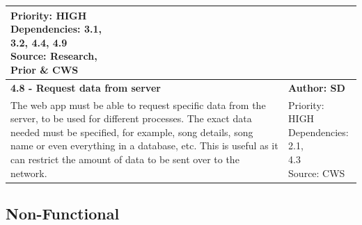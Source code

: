 \documentclass[10pt, notitlepage]{report}
\begin{document}
\begin{center}
\begin{longtable}{| p{13cm} | p{3cm} |}
\makecell{Priority: HIGH\\Dependencies: 3.1,\\3.2, 4.4, 4.9\\Source: Research,\\Prior \& CWS}\\
\hline
\textbf{4.8 -  Request data from server} & \textbf{Author: SD} \\
\hline
The web app must be able to request specific data from the server, to be used for different processes. The exact data needed must be specified, for example, song details, song name or even everything in a database, etc. This is useful as it can restrict the amount of data to be sent over to the network.&
\makecell{Priority: HIGH\\Dependencies: 2.1,\\4.3\\Source: CWS}\\
\hline

\end{longtable}

\end{center}

\subsection{Non-Functional}
\end{document}
